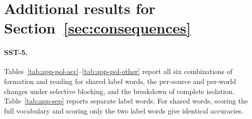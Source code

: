 \begin{table}[t]
\centering\small
{}
\caption{Excess effect (nats) of reversing B's association over exchanging comments within classes, with B's label words and positions fixed (SST-5).
The first three columns compare absolute effects; the last column compares signed effects oriented by A's correct answer.}
\label{tab:app-assoc}
\end{table}

\section{Additional results for Section~\ref{sec:consequences}}
\label{app:policies}

\paragraph{SST-5.}
Tables~\ref{tab:app-pol-acc}--\ref{tab:app-pol-other} report all six combinations of formation and reading for shared label words, the per-source and per-world changes under selective blocking, and the breakdown of complete isolation.
Table~\ref{tab:app-sep} reports separate label words.
For shared words, scoring the full vocabulary and scoring only the two label words give identical accuracies.

\begin{table}[t]
\centering\small
{}
\caption{Accuracy (\%) on SST-5 with shared label words for all combinations of formation and reading.}
\label{tab:app-pol-acc}
\end{table}

\begin{table}[t]
\centering\small
{}
\caption{Change in accuracy (points) from selective blocking, by requested source and by convention world.}
\label{tab:app-pol-delta}
\end{table}


